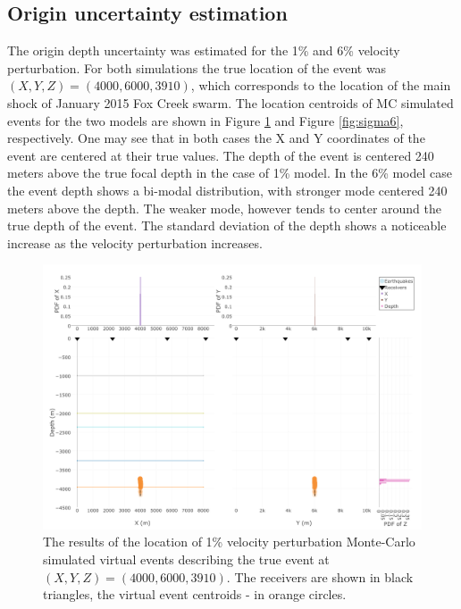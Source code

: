 \subsection{Origin uncertainty estimation}
The origin depth uncertainty was estimated for the 1\% and 6\% velocity perturbation. For both simulations the true location of the event was $(X,Y,Z) = (4000,6000,3910)$, which corresponds to the location of the main shock of January 2015 Fox Creek swarm. The location centroids of MC simulated events for the two models are shown in Figure \ref{fig:sigma1} and Figure \ref{fig:sigma6}, respectively. One may see that in both cases the X and Y coordinates of the event are centered at their true values. The depth of the event is centered 240 meters above the true focal depth in the case of 1\% model. In the 6\% model case the event depth shows a bi-modal distribution, with stronger mode centered 240 meters above the depth. The weaker mode, however tends to center around the true depth of the event. The standard deviation of the depth shows a noticeable increase as the velocity perturbation increases.
\begin{figure}[htb]
\begin{center}
\includegraphics[width=0.8\linewidth,angle=0]{./AntonBiryukov_bibtex/Figure1_1pct.png}
\end{center}
\vspace{-4mm}
\caption{The results of the location of 1\% velocity perturbation Monte-Carlo simulated virtual events describing the true event at $(X,Y,Z) = (4000,6000,3910)$. The receivers are shown in black triangles, the virtual event centroids - in orange circles.}
\label{fig:sigma1}
\end{figure}

